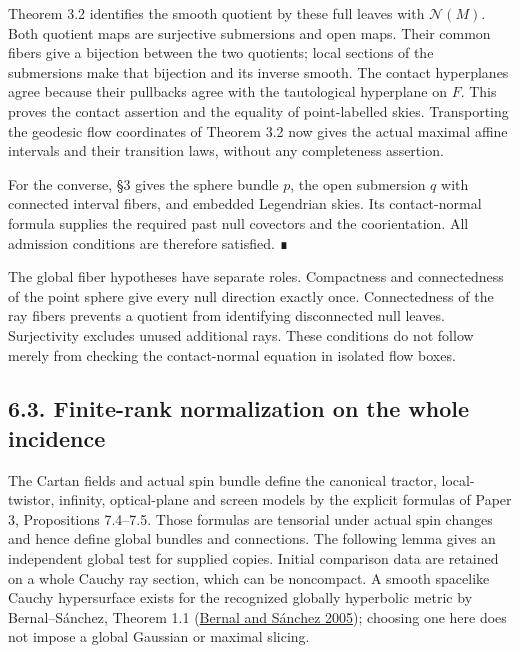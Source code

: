 \documentclass[
  english,
  11pt,
  reqno]{amsart}
\begin{document}
Theorem 3.2 identifies the smooth quotient by these full leaves with
\(\mathcal N(M)\). Both quotient maps are surjective submersions and
open maps. Their common fibers give a bijection between the two
quotients; local sections of the submersions make that bijection and its
inverse smooth. The contact hyperplanes agree because their pullbacks
agree with the tautological hyperplane on \(F\). This proves the contact
assertion and the equality of point-labelled skies. Transporting the
geodesic flow coordinates of Theorem 3.2 now gives the actual maximal
affine intervals and their transition laws, without any completeness
assertion.

For the converse, §3 gives the sphere bundle \(p\), the open submersion
\(q\) with connected interval fibers, and embedded Legendrian skies. Its
contact-normal formula supplies the required past null covectors and the
coorientation. All admission conditions are therefore satisfied. ∎

The global fiber hypotheses have separate roles. Compactness and
connectedness of the point sphere give every null direction exactly
once. Connectedness of the ray fibers prevents a quotient from
identifying disconnected null leaves. Surjectivity excludes unused
additional rays. These conditions do not follow merely from checking the
contact-normal equation in isolated flow boxes.

\protect{}\label{sec:global-finite-rank-normalization}

\subsection{6.3. Finite-rank normalization on the whole
incidence}\label{finite-rank-normalization-on-the-whole-incidence}

The Cartan fields and actual spin bundle define the canonical tractor,
local-twistor, infinity, optical-plane and screen models by the explicit
formulas of Paper 3, Propositions 7.4--7.5. Those formulas are tensorial
under actual spin changes and hence define global bundles and
connections. The following lemma gives an independent global test for
supplied copies. Initial comparison data are retained on a whole Cauchy
ray section, which can be noncompact. A smooth spacelike Cauchy
hypersurface exists for the recognized globally hyperbolic metric by
Bernal--Sánchez, Theorem 1.1 (\hyperref[ref-BernalSanchez2005]{Bernal
and Sánchez 2005}); choosing one here does not impose a global Gaussian
or maximal slicing.
\end{document}
